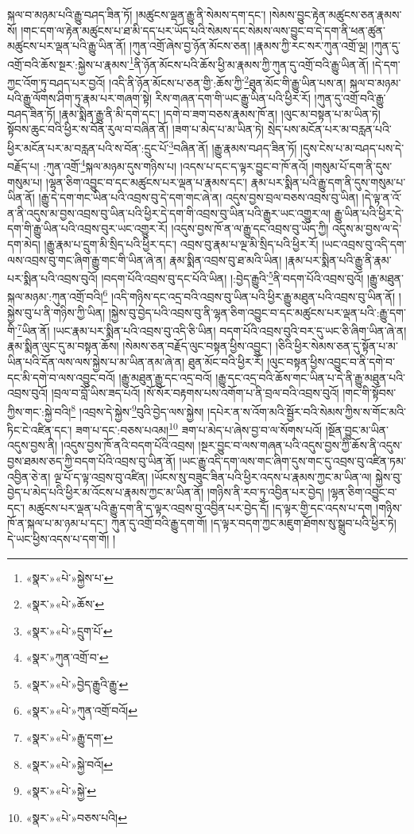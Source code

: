 སྐལ་བ་མཉམ་པའི་རྒྱུ་བཤད་ཟིན་ཏོ། །མཚུངས་ལྡན་རྒྱུ་ནི་སེམས་དག་དང་། །སེམས་བྱུང་རྟེན་མཚུངས་ཅན་རྣམས་སོ། །གང་དག་ལ་རྟེན་མཚུངས་པ་ཐ་མི་དད་པར་ཡོད་པའི་སེམས་དང་སེམས་ལས་བྱུང་བ་དེ་དག་ནི་ཕན་ཚུན་མཚུངས་པར་ལྡན་པའི་རྒྱུ་ཡིན་ནོ། །ཀུན་འགྲོ་ཞེས་བྱ་ཉོན་མོངས་ཅན། །རྣམས་ཀྱི་རང་སར་ཀུན་འགྲོ་ལྔ། །ཀུན་དུ་འགྲོ་བའི་ཆོས་སྔར་:སྐྱེས་པ་རྣམས་\footnote{«སྣར་»«པེ་»སྐྱེས་པ་}ནི་ཉོན་མོངས་པའི་ཆོས་ཕྱི་མ་རྣམས་ཀྱི་ཀུན་དུ་འགྲོ་བའི་རྒྱུ་ཡིན་ནོ། །དེ་དག་ཀྱང་འོག་ཏུ་བཤད་པར་བྱའོ། །འདི་ནི་ཉོན་མོངས་པ་ཅན་གྱི་:ཆོས་ཀྱི་\footnote{«སྣར་»«པེ་»ཆོས་}ཐུན་མོང་གི་རྒྱུ་ཡིན་པས་ན། སྐལ་བ་མཉམ་པའི་རྒྱུ་ལོགས་ཤིག་ཏུ་རྣམ་པར་གཞག་སྟེ། རིས་གཞན་དག་གི་ཡང་རྒྱུ་ཡིན་པའི་ཕྱིར་རོ། །ཀུན་དུ་འགྲོ་བའི་རྒྱུ་བཤད་ཟིན་ཏོ། །རྣམ་སྨིན་རྒྱུ་ནི་མི་དགེ་དང་། །དགེ་བ་ཟག་བཅས་རྣམས་ཁོ་ན། །ལུང་མ་བསྟན་པ་མ་ཡིན་ཏེ། སྟོབས་ཆུང་བའི་ཕྱིར་ས་བོན་རུལ་བ་བཞིན་ནོ། །ཟག་པ་མེད་པ་མ་ཡིན་ཏེ། སྲེད་པས་མངོན་པར་མ་བརླན་པའི་ཕྱིར་མངོན་པར་མ་བརླན་པའི་ས་བོན་:དྲུང་པོ་\footnote{«སྣར་»«པེ་»དྲུག་པོ་}བཞིན་ནོ། །རྒྱུ་རྣམས་བཤད་ཟིན་ཏོ། །དུས་ངེས་པ་མ་བཤད་པས་དེ་བརྗོད་པ། :ཀུན་འགྲོ་\footnote{«སྣར་»ཀུན་འགྲོ་བ་}སྐལ་མཉམ་དུས་གཉིས་པ། །འདས་པ་དང་ད་ལྟར་བྱུང་བ་ཁོ་ནའོ། །གསུམ་པོ་དག་ནི་དུས་གསུམ་པ། །ལྷན་ཅིག་འབྱུང་བ་དང་མཚུངས་པར་ལྡན་པ་རྣམས་དང་། རྣམ་པར་སྨིན་པའི་རྒྱུ་དག་ནི་དུས་གསུམ་པ་ཡིན་ནོ། །རྒྱུ་དེ་དག་གང་ཡིན་པའི་འབྲས་བུ་དེ་དག་གང་ཞེ་ན། འདུས་བྱས་བྲལ་བཅས་འབྲས་བུ་ཡིན། །དེ་ལྟ་ན་འོ་ན་ནི་འདུས་མ་བྱས་འབྲས་བུ་ཡིན་པའི་ཕྱིར་དེ་དག་གི་འབྲས་བུ་ཡིན་པའི་རྒྱུར་ཡང་འགྱུར་ལ། རྒྱུ་ཡིན་པའི་ཕྱིར་དེ་དག་གི་རྒྱུ་ཡིན་པའི་འབྲས་བུར་ཡང་འགྱུར་རོ། །འདུས་བྱས་ཁོ་ན་ལ་རྒྱུ་དང་འབྲས་བུ་ཡོད་ཀྱི། འདུས་མ་བྱས་ལ་དེ་དག་མེད། །རྒྱུ་རྣམ་པ་དྲུག་མི་སྲིད་པའི་ཕྱིར་དང་། འབྲས་བུ་རྣམ་པ་ལྔ་མི་སྲིད་པའི་ཕྱིར་རོ། །ཡང་འབྲས་བུ་འདི་དག་ལས་འབྲས་བུ་གང་ཞིག་རྒྱུ་གང་གི་ཡིན་ཞེ་ན། རྣམ་སྨིན་འབྲས་བུ་ཐ་མའི་ཡིན། །རྣམ་པར་སྨིན་པའི་རྒྱུ་ནི་རྣམ་པར་སྨིན་པའི་འབྲས་བུའོ། །བདག་པོའི་འབྲས་བུ་དང་པོའི་ཡིན། །:བྱེད་རྒྱུའི་\footnote{«སྣར་»«པེ་»བྱེད་རྒྱུའི་རྒྱུ་}ནི་བདག་པོའི་འབྲས་བུའོ། །རྒྱུ་མཐུན་སྐལ་མཉམ་:ཀུན་འགྲོ་བའི།\footnote{«སྣར་»«པེ་»ཀུན་འགྲོ་བའོ།} །འདི་གཉིས་དང་འདྲ་བའི་འབྲས་བུ་ཡིན་པའི་ཕྱིར་རྒྱུ་མཐུན་པའི་འབྲས་བུ་ཡིན་ནོ། །སྐྱེས་བུ་པ་ནི་གཉིས་ཀྱི་ཡིན། །སྐྱེས་བུ་བྱེད་པའི་འབྲས་བུ་ནི་ལྷན་ཅིག་འབྱུང་བ་དང་མཚུངས་པར་ལྡན་པའི་:རྒྱུ་དག་གི་\footnote{«སྣར་»«པེ་»རྒྱུ་དག་}ཡིན་ནོ། །ཡང་རྣམ་པར་སྨིན་པའི་འབྲས་བུ་འདི་ཅི་ཡིན། བདག་པོའི་འབྲས་བུའི་བར་དུ་ཡང་ཅི་ཞིག་ཡིན་ཞེ་ན། རྣམ་སྨིན་ལུང་དུ་མ་བསྟན་ཆོས། །སེམས་ཅན་བརྗོད་ལུང་བསྟན་ཕྱིས་འབྱུང་། །ཅིའི་ཕྱིར་སེམས་ཅན་དུ་སྟོན་པ་མ་ཡིན་པའི་དོན་ལས་ལས་སྐྱེས་པ་མ་ཡིན་ནམ་ཞེ་ན། ཐུན་མོང་བའི་ཕྱིར་རོ། །ལུང་བསྟན་ཕྱིས་འབྱུང་བ་ནི་དགེ་བ་དང་མི་དགེ་བ་ལས་འབྱུང་བའོ། །རྒྱུ་མཐུན་རྒྱུ་དང་འདྲ་བའོ། །རྒྱུ་དང་འདྲ་བའི་ཆོས་གང་ཡིན་པ་དེ་ནི་རྒྱུ་མཐུན་པའི་འབྲས་བུའོ། །བྲལ་བ་བློ་ཡིས་ཟད་པའོ། །སོ་སོར་བརྟགས་པས་འགོག་པ་ནི་བྲལ་བའི་འབྲས་བུའོ། །གང་གི་སྟོབས་ཀྱིས་གང་:སྐྱེ་བའི།\footnote{«སྣར་»«པེ་»སྐྱེ་བའོ།} །འབྲས་དེ་སྐྱེས་\footnote{«སྣར་»«པེ་»སྐྱེ་}བུའི་བྱེད་ལས་སྐྱེས། །དཔེར་ན་ས་འོག་མའི་སྦྱོར་བའི་སེམས་ཀྱིས་ས་གོང་མའི་ཏིང་ངེ་འཛིན་དང་། ཟག་པ་དང་:བཅས་པའམ།\footnote{«སྣར་»«པེ་»བཅས་པའི།} ཟག་པ་མེད་པ་ཞེས་བྱ་བ་ལ་སོགས་པའོ། །སྔོན་བྱུང་མ་ཡིན་འདུས་བྱས་ནི། །འདུས་བྱས་ཁོ་ནའི་བདག་པོའི་འབྲས། །སྔར་བྱུང་བ་ལས་གཞན་པའི་འདུས་བྱས་ཀྱི་ཆོས་ནི་འདུས་བྱས་ཐམས་ཅད་ཀྱི་བདག་པོའི་འབྲས་བུ་ཡིན་ནོ། །ཡང་རྒྱུ་འདི་དག་ལས་གང་ཞིག་དུས་གང་དུ་འབྲས་བུ་འཛིན་ཏམ་འབྱིན་ཅེ་ན། ལྔ་པོ་ད་ལྟ་འབྲས་བུ་འཛིན། །ཡོངས་སུ་བཟུང་ཟིན་པའི་ཕྱིར་འདས་པ་རྣམས་ཀྱང་མ་ཡིན་ལ། སྐྱེས་བུ་བྱེད་པ་མེད་པའི་ཕྱིར་མ་འོངས་པ་རྣམས་ཀྱང་མ་ཡིན་ནོ། །གཉིས་ནི་རབ་ཏུ་འབྱིན་པར་བྱེད། །ལྷན་ཅིག་འབྱུང་བ་དང་། མཚུངས་པར་ལྡན་པའི་རྒྱུ་དག་ནི་ད་ལྟར་འབྲས་བུ་འབྱིན་པར་བྱེད་དོ། །ད་ལྟར་གྱི་དང་འདས་པ་དག །གཉིས་ཁོ་ན་སྐལ་པ་མ་ཉམ་པ་དང་། ཀུན་དུ་འགྲོ་བའི་རྒྱུ་དག་གོ། །ད་ལྟར་བདག་ཀྱང་མཇུག་ཐོགས་སུ་སྒྲུབ་པའི་ཕྱིར་ཏེ། དེ་ཡང་ཕྱིས་འདས་པ་དག་གོ། །
